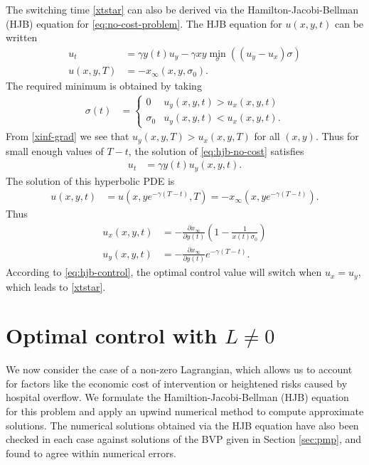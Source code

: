 \documentclass[english,12pt,letter]{article}
\newcommand{\Rnot}{\sigma_0}
\newcommand{\Sinf}{x_\infty}
\begin{document}
The switching time \eqref{xtstar} can also be derived via the Hamilton-Jacobi-Bellman (HJB) equation
for \eqref{eq:no-cost-problem}.  The HJB equation for $u(x,y,t)$ can be written
\begin{subequations} \label{eq:hjb-no-cost}
\begin{align}
    u_t & = \gamma y(t) u_y - \gamma x y \min_\sigma \left((u_y-u_x)\sigma\right) \\
    u(x,y,T) & = -\Sinf(x,y,\Rnot).
\end{align}
\end{subequations}
The required minimum is obtained by taking
\begin{align} \label{eq:hjb-control}
    \sigma(t) & = \begin{cases} 
        0 & u_y(x,y,t) > u_x(x,y,t) \\
        \Rnot & u_y(x,y,t)<u_x(x,y,t).
    \end{cases}
\end{align}
From \eqref{xinf-grad} we see that $u_y(x,y,T)>u_x(x,y,T)$ for all $(x,y)$.
Thus for small enough values of $T-t$, the solution of \eqref{eq:hjb-no-cost} satisfies
\begin{align*}
    u_t & = \gamma y(t) u_y(x,y,t).
\end{align*}
The solution of this hyperbolic PDE is
\begin{align*}
    u(x,y,t) & = u(x,ye^{-\gamma(T-t)},T) = -\Sinf(x,ye^{-\gamma(T-t)}).
\end{align*}
Thus
\begin{align*}
    u_x(x,y,t) & = -\frac{\partial \Sinf}{\partial y(t)} \left(1- \frac{1}{x(t)\Rnot}\right) \\
    u_y(x,y,t) & = -\frac{\partial \Sinf}{\partial y(t)} e^{-\gamma(T-t)}.
\end{align*}
According to \eqref{eq:hjb-control}, the optimal control value will switch when $u_x=u_y$, which
leads to \eqref{xtstar}.


\section{Optimal control with $L\ne 0$\label{sec:exploration}}
We now consider the case of a non-zero Lagrangian, which allows us to account for factors
like the economic cost of intervention or heightened risks caused by hospital
overflow.  We formulate the Hamiltion-Jacobi-Bellman (HJB) equation for this problem and
apply an upwind numerical method to compute approximate solutions.
The numerical solutions obtained via the HJB equation have also been checked in each case
against solutions of the BVP given in Section \ref{sec:pmp}, and found to
agree within numerical errors.
\end{document}
